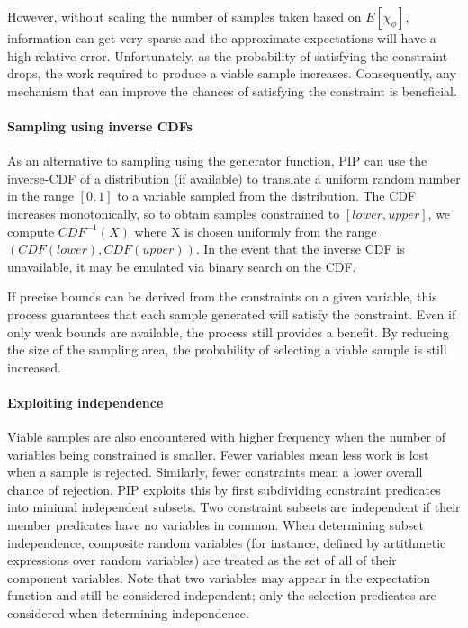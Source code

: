 However, without scaling the number of samples taken based on $E[\chi_\phi]$, information can get very sparse and the approximate expectations will have a high relative error.  Unfortunately, as the probability of satisfying the constraint drops, the work required to produce a viable sample increases.   Consequently, any mechanism that can improve the chances of satisfying the constraint is beneficial.

\paragraph{Sampling using inverse CDFs}
\label{subsec:icdf}
As an alternative to sampling using the generator function, PIP can use the inverse-CDF of a distribution (if available) to translate a uniform random number in the range $[0,1]$ to a variable sampled from the distribution.  The CDF increases monotonically, so to obtain samples constrained to $[lower, upper]$, we compute $CDF^{-1}(X)$ where X is chosen uniformly  from the range $(CDF(lower), CDF(upper))$.  In the event that the inverse CDF is unavailable, it may be emulated via binary search on the CDF.


If precise bounds can be derived from the constraints on a given variable, this process guarantees that each sample generated will satisfy the constraint.  Even if only weak bounds are available, the process still provides a benefit.  By reducing the size of the sampling area, the probability of selecting a viable sample is still increased.  

\paragraph{Exploiting independence}
\label{subsec:independence}
Viable samples are also encountered with higher frequency when the number of variables being constrained is smaller.  Fewer variables mean less work is lost when a sample is rejected.  Similarly, fewer constraints mean a lower overall chance of rejection.  PIP exploits this by first subdividing constraint predicates into minimal independent subsets.  Two constraint subsets are independent if their member predicates have no variables in common.  When determining subset independence, composite random variables (for instance, defined by artithmetic expressions over random variables) are treated as the set of all of their component variables.  Note that two variables may appear in the expectation function and still be considered independent; only the selection predicates are considered when determining independence.

